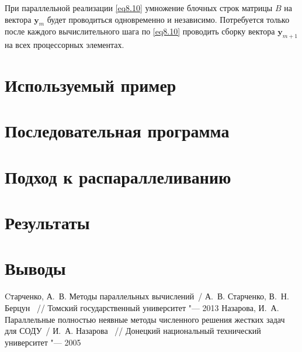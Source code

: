 \documentclass[14pt,final,titlepage,pscyr]{hedwork}
\renewcommand{\vec}[1]{\mathbf{#1}}
\begin{document}
	При параллельной реализации \eqref{eq8.10} умножение блочных строк матрицы \( B \) на вектора 
	\( \vec{y}_m \) будет проводиться одновременно и независимо. Потребуется только после каждого 
	вычислительного шага по \eqref{eq8.10} проводить сборку вектора \( \vec{y}_{m+1} \) на всех процессорных 
	элементах.\cite{methods}

\section{Используемый пример}
\section{Последовательная программа}
\section{Подход к распараллеливанию}
\section{Результаты}
\section{Выводы}

\renewcommand{\bibname}{Список используемой литературы}
\begin{thebibliography}{10}
	 Cтарченко, А.~В. Методы параллельных вычислений~/ А.~В. Старченко, В.~Н. Берцун ~// 
		Томский государственный университет "--- 2013
	 Назарова, И.~А. Параллельные полностью неявные методы численного решения жестких 
		задач для СОДУ~/ И.~А. Назарова ~// Донецкий национальный технический университет "--- 2005
\end{thebibliography}

\end{document}

